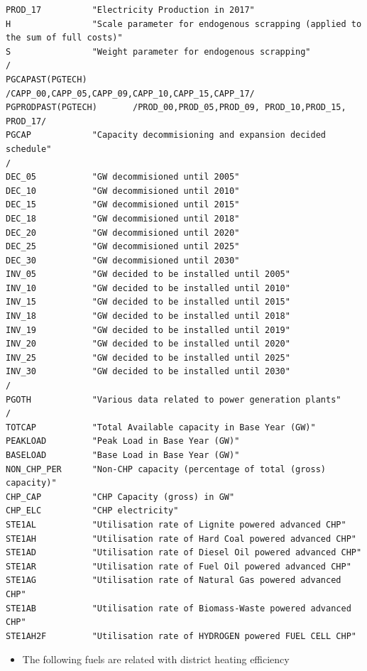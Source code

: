 \documentclass[a4paper,]{scrartcl}
\providecommand{\tightlist}{%
  \setlength{\itemsep}{0pt}\setlength{\parskip}{0pt}}
\begin{document}
\begin{lstlisting}
PROD_17          "Electricity Production in 2017"
H                "Scale parameter for endogenous scrapping (applied to the sum of full costs)"
S                "Weight parameter for endogenous scrapping"
/
PGCAPAST(PGTECH)         /CAPP_00,CAPP_05,CAPP_09,CAPP_10,CAPP_15,CAPP_17/
PGPRODPAST(PGTECH)       /PROD_00,PROD_05,PROD_09, PROD_10,PROD_15, PROD_17/
PGCAP            "Capacity decommisioning and expansion decided schedule"
/
DEC_05           "GW decommisioned until 2005"
DEC_10           "GW decommisioned until 2010"
DEC_15           "GW decommisioned until 2015"
DEC_18           "GW decommisioned until 2018"
DEC_20           "GW decommisioned until 2020"
DEC_25           "GW decommisioned until 2025"
DEC_30           "GW decommisioned until 2030"
INV_05           "GW decided to be installed until 2005"
INV_10           "GW decided to be installed until 2010"
INV_15           "GW decided to be installed until 2015"
INV_18           "GW decided to be installed until 2018"
INV_19           "GW decided to be installed until 2019"
INV_20           "GW decided to be installed until 2020"
INV_25           "GW decided to be installed until 2025"
INV_30           "GW decided to be installed until 2030"
/
PGOTH            "Various data related to power generation plants"
/
TOTCAP           "Total Available capacity in Base Year (GW)"
PEAKLOAD         "Peak Load in Base Year (GW)"
BASELOAD         "Base Load in Base Year (GW)"
NON_CHP_PER      "Non-CHP capacity (percentage of total (gross) capacity)"
CHP_CAP          "CHP Capacity (gross) in GW"
CHP_ELC          "CHP electricity"
STE1AL           "Utilisation rate of Lignite powered advanced CHP"
STE1AH           "Utilisation rate of Hard Coal powered advanced CHP"
STE1AD           "Utilisation rate of Diesel Oil powered advanced CHP"
STE1AR           "Utilisation rate of Fuel Oil powered advanced CHP"
STE1AG           "Utilisation rate of Natural Gas powered advanced CHP"
STE1AB           "Utilisation rate of Biomass-Waste powered advanced CHP"
STE1AH2F         "Utilisation rate of HYDROGEN powered FUEL CELL CHP"
\end{lstlisting}

\begin{itemize}
\tightlist
\item
  The following fuels are related with district heating efficiency
\end{itemize}
\end{document}
